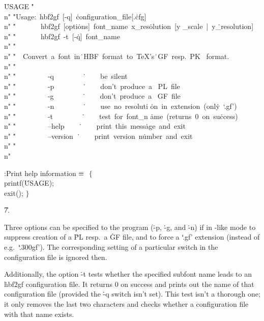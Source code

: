 \Y\B\4\D\.{USAGE}\6
\.{"\\n"}\6
\.{"Usage:\ hbf2gf\ [-q]\ }\)\.{configuration\_file[.}\)\.{cfg]\\n"}\6
\.{"\ \ \ \ \ \ \ hbf2gf\ [opti}\)\.{ons]\ font\_name\ x\_res}\)\.{olution\ [y%
\_scale\ |\ y}\)\.{\_resolution]\\n"}\6
\.{"\ \ \ \ \ \ \ hbf2gf\ -t\ [-}\)\.{q]\ font\_name\\n"}\6
\.{"\\n"}\6
\.{"\ \ Convert\ a\ font\ in}\)\.{\ HBF\ format\ to\ TeX's}\)\.{\ GF\ resp.\ PK%
\ format.}\)\.{\\n"}\6
\.{"\\n"}\6
\.{"\ \ \ \ \ \ \ \ \ -q\ \ \ \ \ \ \ \ }\)\.{\ \ \ \ \ be\ silent\\n"}\6
\.{"\ \ \ \ \ \ \ \ \ -p\ \ \ \ \ \ \ \ }\)\.{\ \ \ \ \ don't\ produce\ a}\)\.{%
\ PL\ file\\n"}\6
\.{"\ \ \ \ \ \ \ \ \ -g\ \ \ \ \ \ \ \ }\)\.{\ \ \ \ \ don't\ produce\ a}\)\.{%
\ GF\ file\\n"}\6
\.{"\ \ \ \ \ \ \ \ \ -n\ \ \ \ \ \ \ \ }\)\.{\ \ \ \ \ use\ no\ resoluti}\)%
\.{on\ in\ extension\ (onl}\)\.{y\ `.gf')\\n"}\6
\.{"\ \ \ \ \ \ \ \ \ -t\ \ \ \ \ \ \ \ }\)\.{\ \ \ \ \ test\ for\ font\_n}\)%
\.{ame\ (returns\ 0\ on\ su}\)\.{ccess)\\n"}\6
\.{"\ \ \ \ \ \ \ \ \ --help\ \ \ \ }\)\.{\ \ \ \ \ print\ this\ mess}\)\.{age\
and\ exit\\n"}\6
\.{"\ \ \ \ \ \ \ \ \ --version\ }\)\.{\ \ \ \ \ print\ version\ n}\)\.{umber\
and\ exit\\n"}\6
\.{"\\n"}\par
\Y\B\4:Print help information\X${}\equiv{}$\6
${}\{{}$\1\6
\\{printf}(\.{USAGE});\6
\\{exit}();\6
\4${}\}{}$\2\par
\U7.\fi

Three options can be specified to the program (\.{-p}, \.{-g}, and \.{-n})
if in \mf-like mode to suppress creation of a \.{PL} resp.\ a
\.{GF} file, and to force a `\.{.gf}' extension (instead of
e.g.\ `\.{.300gf}'). The corresponding setting of a particular switch in the
configuration file is ignored then.

Additionally, the option \.{-t} tests whether the specified subfont name
leads to an \.{hbf2gf} configuration file. It returns 0 on success and prints
out the name of that configuration file (provided the \.{-q} switch isn't
set). This test isn't a thorough one; it only removes the last two characters
and checks whether a configuration file with that name exists.


